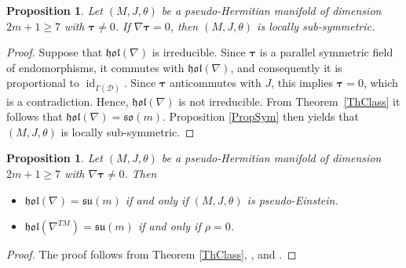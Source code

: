 \documentclass{amsart}
\theoremstyle{plain}
\newtheorem{prop}[theorem]{Proposition}
\newtheorem{lem}[theorem]{Lemma}
\theoremstyle{definition}
\def\R{\mathcal{R}}
\newcommand{\id}{\operatorname{id}}
\def\so{\mathfrak{so}}
\def\su{\mathfrak{su}}
\newcommand{\hol}{\mathfrak{hol}}
\newcommand{\bt}{{\boldsymbol{\tau}}}
\newcommand{\1}{\mathbf{1}}
\newcommand{\D}{{\mathcal D}}
\newcommand{\+}{\oplus}
\begin{document}
 
 \begin{prop} Let $(M,J,\theta)$ be a pseudo-Hermitian manifold of dimension $2m+1\geq 7$ with $\bt\neq 0$. If $\nabla\bt=0$, then $(M,J,\theta)$ is locally sub-symmetric.
 \end{prop}
 
 \begin{proof} Suppose that $\hol(\nabla)$ is irreducible. Since $\bt$ is a  parallel symmetric field of  endomorphisms, it commutes with $\hol(\nabla)$, and consequently it is proportional to $\id_{\Gamma(\D)}$. Since $\bt$ anticommutes with $J$, this implies $\bt=0$, which is a contradiction. Hence, $\hol(\nabla)$ is not irreducible. From Theorem~\ref{ThClass} it follows that $\hol(\nabla)=\so(m)$.  Proposition \ref{PropSym} then yields that  $(M,J,\theta)$ is locally sub-symmetric. \end{proof}
 
 
 \begin{prop}\label{PropClassCases} 
 	Let $(M,J,\theta)$ be a pseudo-Hermitian manifold of dimension $2m+1\geq 7$ with $\nabla\bt \neq 0$. Then 
 	\begin{itemize}
 		\item[1.] $\hol(\nabla)=\su(m)$ if and only if $(M,J,\theta)$ is pseudo-Einstein.
 		\item[2.] $\hol(\nabla^{TM})=\su(m)$ if and only if $\rho=0$.
 	\end{itemize}
 \end{prop}

\begin{proof} The proof follows from Theorem \ref{ThClass}, \cite[Theorem~4.1]{Leitner18}, and  
 \cite[Corollary~4.2]{Leitner18}. \end{proof}
 
 
 


\end{document}
